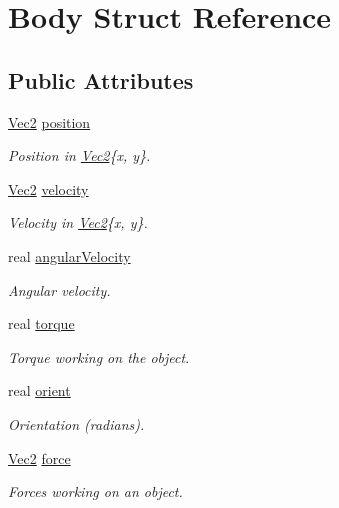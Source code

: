 \hypertarget{struct_body}{}\section{Body Struct Reference}
\label{struct_body}
\subsection*{Public Attributes}
\begin{DoxyCompactItemize}
\item 
\mbox{\hyperlink{struct_vec2}{Vec2}} \mbox{\hyperlink{struct_body_a659001c4570d0ad46bf609ab06447860}{position}}
\begin{DoxyCompactList}\small\item\em Position in \mbox{\hyperlink{struct_vec2}{Vec2}}\{x, y\}. \end{DoxyCompactList}\item 
\mbox{\hyperlink{struct_vec2}{Vec2}} \mbox{\hyperlink{struct_body_a3723eaa2db4c9a3ac68b9745e11a0a40}{velocity}}
\begin{DoxyCompactList}\small\item\em Velocity in \mbox{\hyperlink{struct_vec2}{Vec2}}\{x, y\}. \end{DoxyCompactList}\item 
real \mbox{\hyperlink{struct_body_a78f0f4d1c6a6b9efaefd5a03bd8de598}{angular\+Velocity}}
\begin{DoxyCompactList}\small\item\em Angular velocity. \end{DoxyCompactList}\item 
real \mbox{\hyperlink{struct_body_a269761d1be497882d3f3a2aef4847152}{torque}}
\begin{DoxyCompactList}\small\item\em Torque working on the object. \end{DoxyCompactList}\item 
real \mbox{\hyperlink{struct_body_a93534f084248dd60be496754361c1a22}{orient}}
\begin{DoxyCompactList}\small\item\em Orientation (radians). \end{DoxyCompactList}\item 
\mbox{\hyperlink{struct_vec2}{Vec2}} \mbox{\hyperlink{struct_body_a0399faa61bf3850a1dacb2ed3f377ba5}{force}}
\begin{DoxyCompactList}\small\item\em Forces working on an object. \end{DoxyCompactList}\item 

\end{DoxyCompactItemize}
